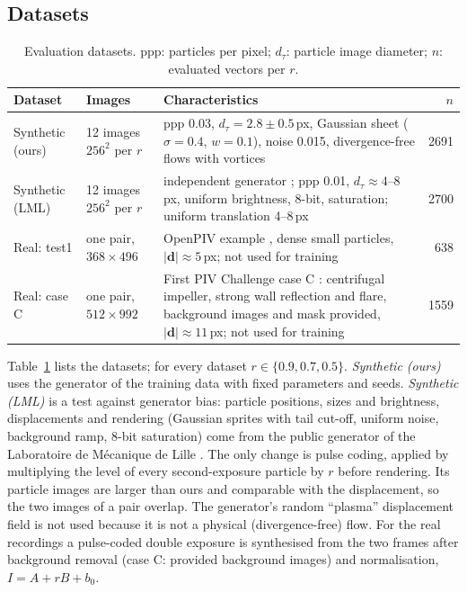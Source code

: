 \documentclass[11pt]{article}
\theoremstyle{remark}
\newcommand{\dd}{\mathbf{d}}
\begin{document}
\subsection{Datasets}
\begin{table}[t]
\centering
\caption{Evaluation datasets. ppp: particles per pixel; $d_\tau$: particle image diameter; $n$: evaluated vectors per $r$.}
\label{tab:data}
\small
\begin{tabular}{lp{4.3cm}p{5.0cm}r}
\toprule
Dataset & Images & Characteristics & $n$\\
\midrule
Synthetic (ours) & 12 images $256^2$ per $r$ & ppp 0.03, $d_\tau=2.8\pm0.5$\,px, Gaussian sheet ($\sigma=0.4$, $w=0.1$), noise 0.015, divergence-free flows with vortices & 2691\\
Synthetic (LML) & 12 images $256^2$ per $r$ & independent generator \citep{coudert_lml}; ppp 0.01, $d_\tau\approx4$--8\,px, uniform brightness, 8-bit, saturation; uniform translation 4--8\,px & 2700\\
Real: test1 & one pair, $368\times496$ & OpenPIV example \citep{openpiv}, dense small particles, $|\dd|\approx5$\,px; not used for training & 638\\
Real: case C & one pair, $512\times992$ & First PIV Challenge case C \citep{stanislas2003}: centrifugal impeller, strong wall reflection and flare, background images and mask provided, $|\dd|\approx11$\,px; not used for training & 1559\\
\bottomrule
\end{tabular}
\end{table}

Table~\ref{tab:data} lists the datasets; for every dataset $r\in\{0.9,0.7,0.5\}$.
\emph{Synthetic (ours)} uses the generator of the training data with fixed parameters and seeds.
\emph{Synthetic (LML)} is a test against generator bias: particle positions, sizes and brightness, displacements and rendering (Gaussian sprites with tail cut-off, uniform noise, background ramp, 8-bit saturation) come from the public generator of the Laboratoire de M\'ecanique de Lille \citep{coudert_lml}. The only change is pulse coding, applied by multiplying the level of every second-exposure particle by $r$ before rendering. Its particle images are larger than ours and comparable with the displacement, so the two images of a pair overlap. The generator's random ``plasma'' displacement field is not used because it is not a physical (divergence-free) flow.
For the real recordings a pulse-coded double exposure is synthesised from the two frames after background removal (case C: provided background images) and normalisation, $I=A+rB+b_0$.
\end{document}
